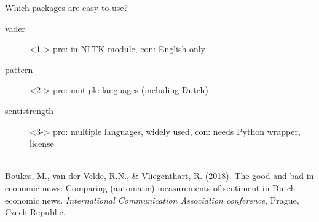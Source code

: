 \documentclass{beamer}
\begin{document}
\begin{frame}{Which packages are easy to use?}
	
\begin{description}
	\item[vader]<1-> pro: in NLTK module, con: English only
	\item[pattern]<2-> pro: mutiple languages (including Dutch)
	\item[sentistrength]<3-> pro: multiple languages, widely used, con: needs Python wrapper, license
	
\end{description}




\end{frame}


\begin{frame}%
\\
\tiny
Boukes, M., van der Velde, R.N., \& Vliegenthart, R. (2018). The good and bad in economic news: Comparing (automatic) measurements of sentiment in Dutch economic news. \emph{International Communication Association conference}, Prague, Czech Republic.
\end{frame}
\end{document}
